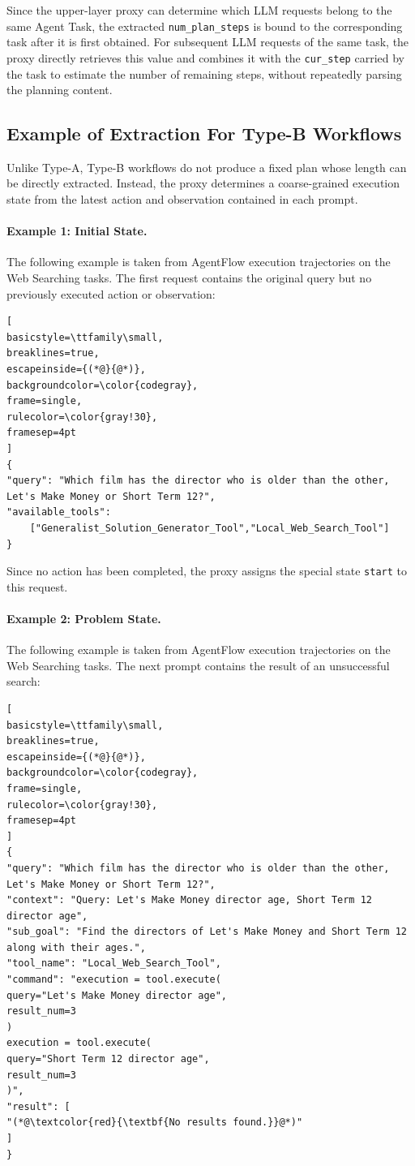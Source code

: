Since the upper-layer proxy can determine which LLM requests belong to the same Agent Task, the extracted \texttt{num\_plan\_steps} is bound to the corresponding task after it is first obtained. For subsequent LLM requests of the same task, the proxy directly retrieves this value and combines it with the \texttt{cur\_step} carried by the task to estimate the number of remaining steps, without repeatedly parsing the planning content.


\subsection{Example of Extraction For Type-B Workflows}

Unlike Type-A, Type-B workflows do not produce a fixed plan whose
length can be directly extracted. Instead, the proxy determines a
coarse-grained execution state from the latest action and observation
contained in each prompt. 

\paragraph{Example 1: Initial State.}
The following example is taken from AgentFlow execution trajectories on the Web Searching tasks.
The first request contains the original query but no previously
executed action or observation:

\begin{lstlisting}[
basicstyle=\ttfamily\small,
breaklines=true,
escapeinside={(*@}{@*)},
backgroundcolor=\color{codegray},
frame=single,
rulecolor=\color{gray!30},
framesep=4pt
]
{
"query": "Which film has the director who is older than the other, Let's Make Money or Short Term 12?",
"available_tools": 
    ["Generalist_Solution_Generator_Tool","Local_Web_Search_Tool"]
}
\end{lstlisting}

Since no action has been completed, the proxy assigns the special
state \texttt{start} to this request.

\paragraph{Example 2: Problem State.}
The following example is taken from AgentFlow execution trajectories on the Web Searching tasks.
The next prompt contains the result of an unsuccessful search:
\begin{lstlisting}[
basicstyle=\ttfamily\small,
breaklines=true,
escapeinside={(*@}{@*)},
backgroundcolor=\color{codegray},
frame=single,
rulecolor=\color{gray!30},
framesep=4pt
]
{
"query": "Which film has the director who is older than the other, Let's Make Money or Short Term 12?",
"context": "Query: Let's Make Money director age, Short Term 12 director age",
"sub_goal": "Find the directors of Let's Make Money and Short Term 12 along with their ages.",
"tool_name": "Local_Web_Search_Tool",
"command": "execution = tool.execute(
query="Let's Make Money director age",
result_num=3
)
execution = tool.execute(
query="Short Term 12 director age",
result_num=3
)",
"result": [
"(*@\textcolor{red}{\textbf{No results found.}}@*)"
]
}
\end{lstlisting}

